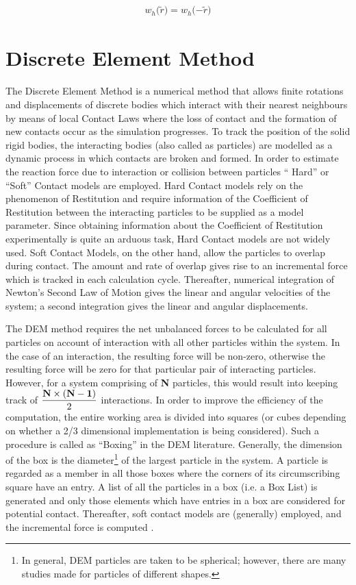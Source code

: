  \begin{eqnarray}\label{eq:kernel-symmetry}
  \textit{w$_h(\widetilde{r}$)} = \textit{w$_h(-\widetilde{r}$)}
 \end{eqnarray}

\section{Discrete Element Method} \label{sec:DEM}

The Discrete Element Method is a numerical method that allows finite rotations and displacements of discrete bodies which interact with their nearest neighbours by means of local Contact Laws where the loss of contact and the formation of new contacts occur as the simulation progresses. To track the position of the solid rigid bodies, the interacting bodies (also called as particles) are modelled as a dynamic process in which contacts are broken and formed. In order to estimate the reaction force due to interaction or collision between particles `` Hard'' or ``Soft'' Contact models are employed. Hard Contact models rely on the phenomenon of Restitution and require information of the Coefficient of Restitution between the interacting particles to be supplied as a model parameter. Since obtaining information about the Coefficient of Restitution experimentally is quite an arduous task, Hard Contact models are not widely used. Soft Contact Models, on the other hand, allow the particles to overlap during contact. The amount and rate of overlap gives rise to an incremental force which is tracked in each calculation cycle. Thereafter, numerical integration of Newton's Second Law of Motion gives the linear and angular velocities of the system; a second integration gives the linear and angular displacements.

The DEM method requires the net unbalanced forces to be calculated for all particles on account of interaction with all other particles within the system. In the case of an interaction, the resulting force will be non-zero, otherwise the resulting force will be zero for that particular pair of interacting particles. However, for a system comprising of \textbf{N} particles, this would result into keeping track of $\dfrac{{\bf{N}} \times {\bf{(N-1)}}}{2}$ interactions. In order to improve the efficiency of the computation, the entire working area is divided into squares (or cubes depending on whether a 2/3 dimensional implementation is being considered). Such a procedure is called as ``Boxing'' in the DEM literature. Generally, the dimension of the box is the diameter\footnote{In general, DEM particles are taken to be spherical; however, there are many studies made for particles of different shapes.} of the largest particle in the system. A particle is regarded as a member in all those boxes where the corners of its circumscribing square have an entry.  A list of all the particles in a box (i.e. a Box List) is generated and only those elements which have entries in a box are considered for potential contact. Thereafter, soft contact models are (generally) employed, and the incremental force is computed \cite{mishra}.